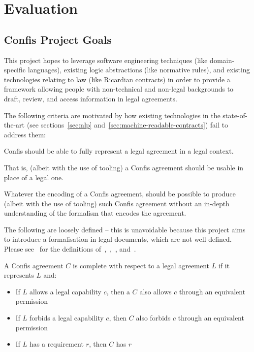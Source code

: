 
\chapter{Evaluation}\label{ch:evaluation}


\section{Confis Project Goals}\label{sec:eval:goals}

This project hopes to leverage software engineering techniques (like domain-specific languages), existing logic abstractions (like normative rules), and existing technologies relating to law (like Ricardian contracts) in order to provide a framework allowing people with non-technical and non-legal backgrounds to draft, review, and access information in legal agreements.

The following criteria are motivated by how existing technologies in the state-of-the-art (see sections~\ref{sec:nlp} and~\ref{sec:machine-readable-contracts}) fail to address them:

\begin{definition}
    \label{def:meaningful-representation}
    Confis should be able to fully represent a legal agreement in a legal context.

    That is, (albeit with the use of tooling) a Confis agreement should be usable in place of a legal one.

\end{definition}

\begin{definition}[Accessibility]
    \label{def:accessibility}
    Whatever the encoding of a Confis agreement, should be possible to produce (albeit with the use of tooling) such Confis agreement without an in-depth understanding of the formalism that encodes the agreement.
\end{definition}

The following are loosely defined -- this is unavoidable because this project aims to introduce a formalisation in legal documents, which are not well-defined.
Please see~ for the definitions of~,~,~, and~.

\begin{definition}[Completeness]
    \label{def:completeness}
    A Confis agreement $C$ is complete with respect to a legal agreement $L$ if it represents $L$ and:

    \begin{itemize}
        \item If $L$ allows a legal capability $c$, then a $C$ also allows $c$ through an equivalent permission
        \item If $L$ forbids a legal capability $c$, then $C$ also forbids $c$ through an equivalent permission
        \item If $L$ has a requirement $r$, then $C$ has $r$
    \end{itemize}
\end{definition}


